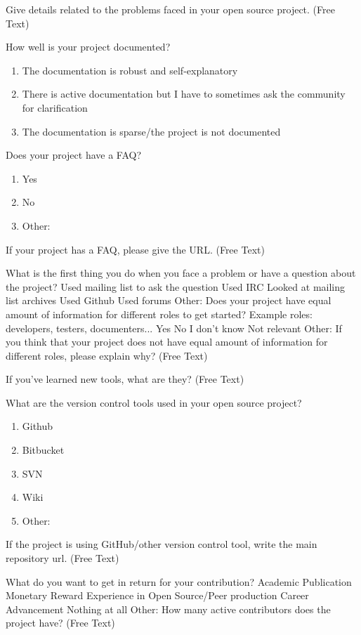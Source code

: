 \begin{table}
Give details related to the problems faced in your open source project. (Free Text)

How well is your project documented?
\begin{enumerate}
\item The documentation is robust and self-explanatory
\item There is active documentation but I have to sometimes ask the community for clarification
\item The documentation is sparse/the project is not documented
\end{enumerate}

Does your project have a FAQ?
\begin{enumerate}
\item Yes
\item No
\item Other:
\end{enumerate}

If your project has a FAQ, please give the URL. (Free Text)

What is the first thing you do when you face a problem or have a question about the project? Used mailing list to ask the question Used IRC Looked at mailing list archives Used Github Used forums Other: Does your project have equal amount of information for different roles to get started? Example roles: developers, testers, documenters... Yes No I don't know Not relevant Other: If you think that your project does not have equal amount of information for different roles, please explain why? (Free Text)

If you've learned new tools, what are they? (Free Text)

What are the version control tools used in your open source project?

\begin{enumerate}
\item Github
\item Bitbucket
\item SVN
\item Wiki
\item Other:
\end{enumerate}

If the project is using GitHub/other version control tool, write the main repository url. (Free Text)

What do you want to get in return for your contribution? Academic Publication Monetary Reward Experience in Open Source/Peer production Career Advancement Nothing at all Other: How many active contributors does the project have? (Free Text)


\end{table}
